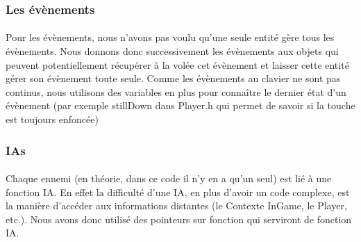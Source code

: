 \subsubsection{Les évènements}

\paragraph{} Pour les évènements, nous n'avons pas voulu qu'une seule entité gère tous les évènements. Nous donnons donc successivement les évènements aux objets qui peuvent potentiellement récupérer à la volée cet évènement et laisser cette entité gérer son évènement toute seule. Comme les évènements au clavier ne sont pas continus, nous utilisons des variables en plus pour connaître le dernier état d'un évènement (par exemple stillDown dans Player.h qui permet de savoir si la touche est toujours enfoncée)

\subsubsection{IAs}

\paragraph{} Chaque ennemi (en théorie, dans ce code il n'y en a qu'un seul) est lié à une fonction IA. En effet la difficulté d'une IA, en plus d'avoir un code complexe, est la manière d'accéder aux informations distantes (le Contexte InGame, le Player, etc.). Nous avons donc utilisé des pointeurs sur fonction qui serviront de fonction IA.
